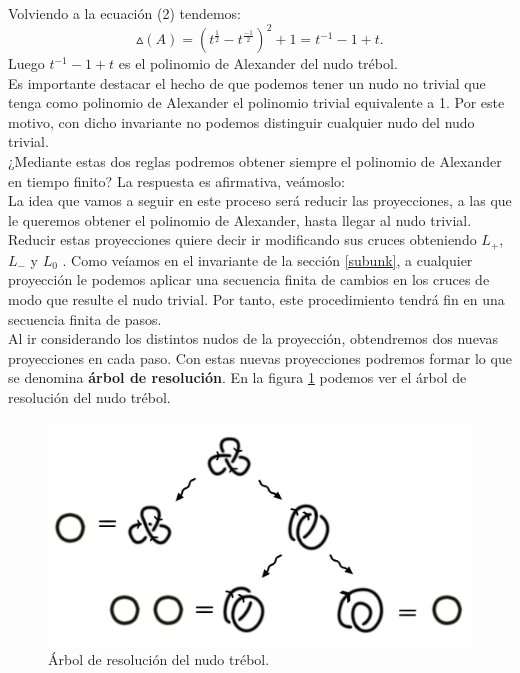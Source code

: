 \documentclass[14pt]{extarticle}
\begin{document}
Volviendo a la ecuación (2) tendemos:
\begin{equation}
\vartriangle(A) =  (t^{\frac{1}{2}} - t^{\frac{-1}{2}})^{2} + 1 = t^{-1} -1 + t.
\end{equation}
Luego $ t^{-1} -1 + t $ es el polinomio de Alexander del nudo trébol. \\

\bigskip
Es importante destacar el hecho de que podemos tener un nudo no trivial que tenga como polinomio de Alexander el polinomio trivial equivalente a 1. Por este motivo, con dicho invariante no podemos distinguir cualquier nudo del nudo trivial. \\

¿Mediante estas dos reglas podremos obtener siempre el polinomio de Alexander en tiempo finito? La respuesta es afirmativa, veámoslo:\\

La idea que vamos a seguir en este proceso será reducir las proyecciones, a las que le queremos obtener el polinomio de Alexander, hasta llegar al nudo trivial. Reducir estas proyecciones quiere decir ir modificando sus cruces obteniendo $L_{+}$, $L_{-}$ y $L_{0}$ . Como veíamos en el invariante de la sección \ref{subunk}, a cualquier proyección le podemos aplicar una secuencia finita de cambios en los cruces de modo que resulte el nudo trivial. Por tanto, este procedimiento tendrá fin en una secuencia finita de pasos.\\

Al ir considerando los distintos nudos de la proyección, obtendremos dos nuevas proyecciones en cada paso. Con estas nuevas proyecciones podremos formar lo que se denomina \textbf{ árbol de resolución}. En la figura \ref{alex4} podemos ver el árbol de resolución del nudo trébol.\\

   \begin{figure}[h!]
   	\centering
   	\includegraphics[width=18cm]{inudos/arbol.png}
   	\caption{Árbol de resolución del nudo trébol.}
   	\label{alex4} 
   \end{figure}
\end{document}
